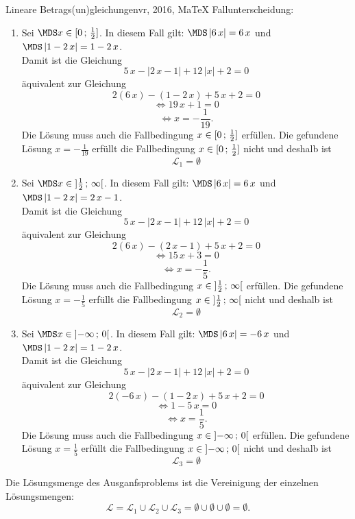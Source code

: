 \begin{MAufgabe}{Lineare Betrags(un)gleichungen}{vr, 2016, MaTeX}
 Fallunterscheidung: 

 \begin{enumerate} 
 \item Sei $ \MDS x\in[ 0 \, \MIntvlSep \, \frac{1}{2}]$. 
 In diesem Fall gilt: 
  $ \MDS \left| 6\, x\right|=6\, x$ und $ \MDS \left| 1 - 2\, x\right|=1 - 2\, x$. \\ 
 Damit ist die Gleichung 
 $$ 
5\, x - \left|2\, x - 1\right| + 12\, \left|x\right| + 2= 0
$$
 \"aquivalent zur Gleichung
 $$ 
2\left(6\, x\right)-\left( 1 - 2\, x\right)+5\, x+2= 0 
$$  
$$ 
 \Leftrightarrow 19\, x + 1= 0 
$$  
$$ \Leftrightarrow x = - \frac{1}{19} . 
 $$ 
 Die L\"osung muss auch die Fallbedingung $x\in [ 0 \, ; \, \frac{1}{2}] $ erf\"ullen. Die gefundene L\"osung $x=- \frac{1}{19}$ erf\"ullt die Fallbedingung  $x\in [ 0 \, ; \, \frac{1}{2}]$ nicht und deshalb ist  $$
 \mathcal{L}_{1}=\emptyset 
 $$ 
\item Sei $ \MDS x\in\MoIl  \frac{1}{2} \, \MIntvlSep \, \infty\MoIr $. 
 In diesem Fall gilt: 
  $ \MDS \left| 6\, x\right|=6\, x$ und $ \MDS \left| 1 - 2\, x\right|=2\, x - 1$. \\ 
 Damit ist die Gleichung 
 $$ 
5\, x - \left|2\, x - 1\right| + 12\, \left|x\right| + 2= 0
$$
 \"aquivalent zur Gleichung
 $$ 
2\left(6\, x\right)-\left( 2\, x - 1\right)+5\, x+2= 0 
$$  
$$ 
 \Leftrightarrow 15\, x + 3= 0 
$$  
$$ \Leftrightarrow x = - \frac{1}{5} . 
 $$ 
 Die L\"osung muss auch die Fallbedingung $x\in \mbox{}]\mathopen{}  \frac{1}{2} \, ; \, \infty[\mbox{}  $ erf\"ullen. Die gefundene L\"osung $x=- \frac{1}{5}$ erf\"ullt die Fallbedingung  $x\in \mbox{}]\mathopen{}  \frac{1}{2} \, ; \, \infty[\mbox{} $ nicht und deshalb ist  $$
 \mathcal{L}_{2}=\emptyset 
 $$ 
\item Sei $ \MDS x\in\MoIl  -\infty \, \MIntvlSep \, 0\MoIr $. 
 In diesem Fall gilt: 
  $ \MDS \left| 6\, x\right|=- 6\, x$ und $ \MDS \left| 1 - 2\, x\right|=1 - 2\, x$. \\ 
 Damit ist die Gleichung 
 $$ 
5\, x - \left|2\, x - 1\right| + 12\, \left|x\right| + 2= 0
$$
 \"aquivalent zur Gleichung
 $$ 
2\left(- 6\, x\right)-\left( 1 - 2\, x\right)+5\, x+2= 0 
$$  
$$ 
 \Leftrightarrow 1 - 5\, x= 0 
$$  
$$ \Leftrightarrow x = \frac{1}{5} . 
 $$ 
 Die L\"osung muss auch die Fallbedingung $x\in \mbox{}]\mathopen{}  -\infty \, ; \, 0[\mbox{}  $ erf\"ullen. Die gefundene L\"osung $x=\frac{1}{5}$ erf\"ullt die Fallbedingung  $x\in \mbox{}]\mathopen{}  -\infty \, ; \, 0[\mbox{} $ nicht und deshalb ist  $$
 \mathcal{L}_{3}=\emptyset 
 $$ 
 \end{enumerate} 
  Die L\"osungsmenge des Ausganfsproblems ist die Vereinigung der einzelnen L\"osungsmengen: 
$$ \mathcal{L} = \mathcal{L}_{1} \cup \mathcal{L}_{2} \cup \mathcal{L}_{3} 
 = \emptyset\cup \emptyset\cup \emptyset 
   =\emptyset 
   . $$ 
 

\end{MAufgabe}
